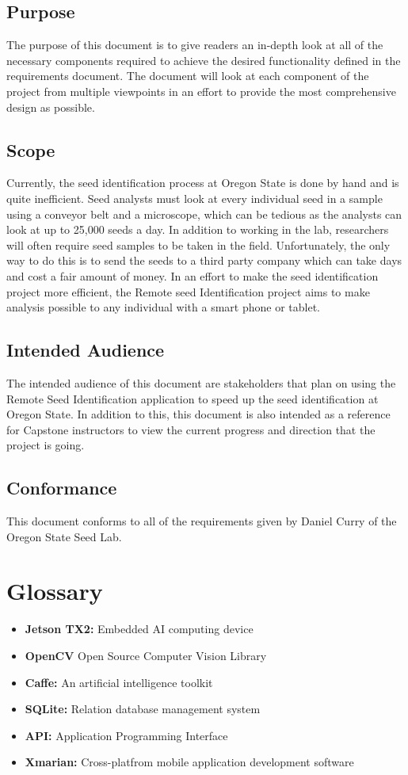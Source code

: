 \documentclass[onecolumn, draftclsnofoot,10pt, compsoc]{IEEEtran}
\begin{document}
\subsection{Purpose}
	The purpose of this document is to give readers an in-depth look at all of the necessary components required to achieve the desired functionality defined in the requirements document. The document will look at each component of the project from multiple viewpoints in an effort to provide the most comprehensive design as possible.
\subsection{Scope}
	Currently, the seed identification process at Oregon State is done by hand and is quite inefficient. Seed analysts must look at every individual seed in a sample using a conveyor belt and a microscope, which can be tedious as the analysts can look at up to 25,000 seeds a day. In addition to working in the lab, researchers will often require seed samples to be taken in the field. Unfortunately, the only way to do this is to send the seeds to a third party company which can take days and cost a fair amount of money. In an effort to make the seed identification project more efficient, the Remote seed Identification project aims to make analysis possible to any individual with a smart phone or tablet. 
\subsection{Intended Audience}
	The intended audience of this document are stakeholders that plan on using the Remote Seed Identification application to speed up the seed identification at Oregon State. In addition to this, this document is also intended as a reference for Capstone instructors to view the current progress and direction that the project is going. 
\subsection{Conformance}
	This document conforms to all of the requirements given by Daniel Curry of the Oregon State Seed Lab. 

\section{Glossary}
\begin{itemize}
	\item \textbf{Jetson TX2:} Embedded AI computing device
    \item \textbf{OpenCV} Open Source Computer Vision Library
    \item \textbf{Caffe:} An artificial intelligence toolkit
    \item \textbf{SQLite:} Relation database management system
    \item \textbf{API:} Application Programming Interface
    \item \textbf{Xmarian:} Cross-platfrom mobile application development software
\end{itemize}
\end{document}
